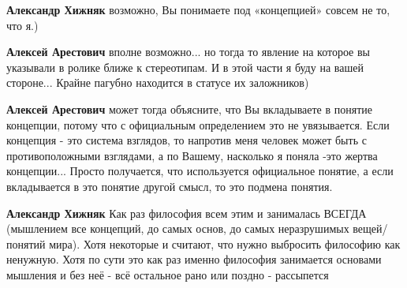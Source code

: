 \begin{itemize}
\begin{itemize}
 
\textbf{Александр Хижняк} возможно, Вы понимаете под «концепцией» совсем не то, что я.)

 
\textbf{Алексей Арестович} вполне возможно... но тогда то явление на которое вы
указывали в ролике ближе к стереотипам. И в этой части я буду на вашей
стороне... Крайне пагубно находится в статусе их заложников)

 
\textbf{Алексей Арестович} может тогда объясните, что Вы вкладываете в понятие
концепции, потому что с официальным определением это не увязывается. Если
концепция - это система взглядов, то напротив меня человек может быть с
противоположными взглядами, а по Вашему, насколько я поняла -это жертва
концепции... Просто получается, что используется официальное понятие, а если
вкладывается в это понятие другой смысл, то это подмена понятия.

 
\textbf{Александр Хижняк} Как раз философия всем этим и занималась ВСЕГДА
(мышлением все концепций, до самых основ, до самых неразрушимых вещей/понятий
мира). Хотя некоторые и считают, что нужно выбросить философию как ненужную.
Хотя по сути это как раз именно философия занимается основами мышления и без
неё - всё остальное рано или поздно - рассыпется

 

\end{itemize}
\end{itemize}
